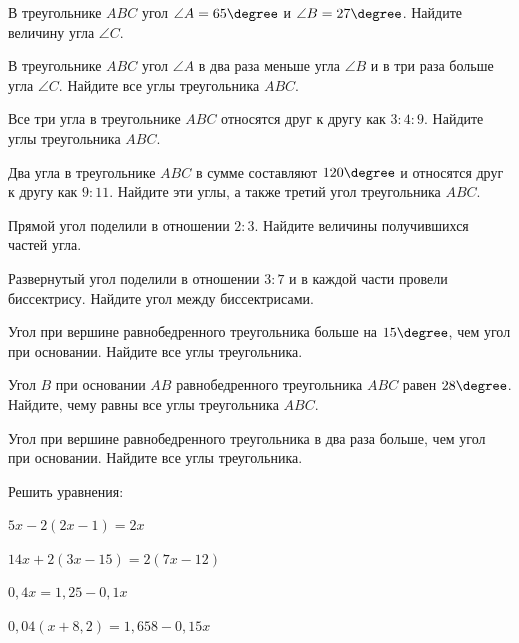 %
\begin{class}[number=4]
	\begin{listofex}
		\item В треугольнике \( ABC \) угол \( \angle A = 65\degree \) и \( \angle B = 27\degree \). Найдите величину угла \( \angle C \).
		\item В треугольнике \( ABC \) угол \( \angle A \) в два раза меньше угла \( \angle B \) и в три раза больше угла \( \angle C \). Найдите все углы треугольника \( ABC \).
		\item Все три угла в треугольнике \( ABC \) относятся друг к другу как \( 3:4:9 \). Найдите углы треугольника \( ABC \).
		\item Два угла в треугольнике \( ABC \) в сумме составляют \( 120\degree \) и относятся друг к другу как \( 9:11 \). Найдите эти углы, а также третий угол треугольника \( ABC \).
		\item Прямой угол поделили в отношении \( 2:3 \). Найдите величины получившихся частей угла.
		\item Развернутый угол поделили в отношении \( 3:7 \) и в каждой части провели биссектрису. Найдите угол между биссектрисами.
		\item Угол при вершине равнобедренного треугольника больше на \(15 \degree\), чем угол при основании. Найдите все углы треугольника.
		\item Угол \( B \) при основании \( AB \) равнобедренного треугольника \( ABC \) равен \( 28\degree \). Найдите, чему равны все углы треугольника \( ABC \).
		\item Угол при вершине равнобедренного треугольника в два раза больше, чем угол при основании. Найдите все углы треугольника.
		\item Решить уравнения:
		\begin{enumcols}[itemcolumns=2]
			\item \( 5x-2(2x-1)=2x \)
			\item \( 14x+2(3x-15)=2(7x-12) \)
			\item \( 0,4x=1,25-0,1x \)
			\item \( 0,04(x+8,2)=1,658-0,15x \)
		\end{enumcols}
	\end{listofex}
\end{class}
%
%
%
